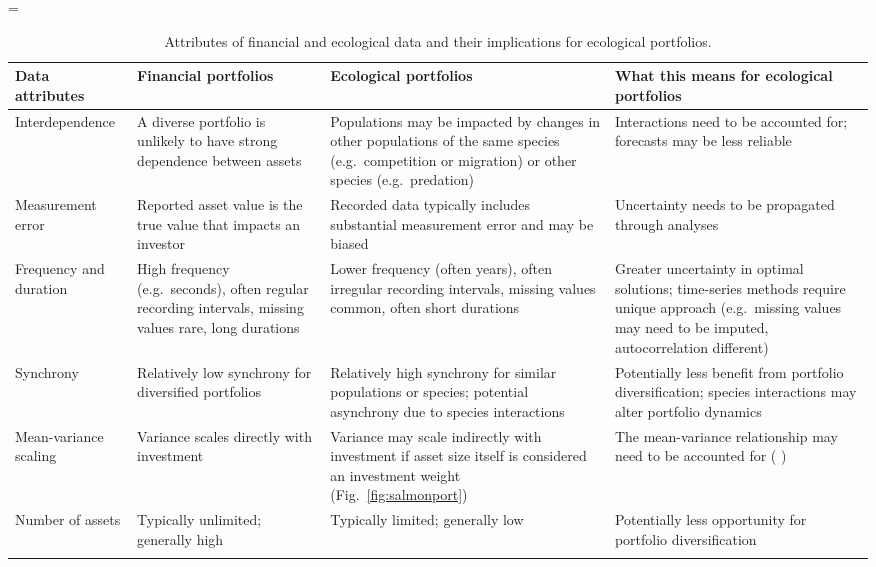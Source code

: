 \LTcapwidth=\textwidth
{}
\begin{footnotesize}

\begin{longtable}{>{\RaggedRight}p{2.7cm}>{\RaggedRight}p{3.3cm}>{\RaggedRight}p{3.9cm}>{\RaggedRight}p{4.2cm}}

\caption{Attributes of financial and ecological data and their implications for ecological portfolios.}\\
\toprule

\textbf{Data attributes} &
\textbf{Financial portfolios} &
\textbf{Ecological portfolios} &
\textbf{What this means for ecological portfolios}\\

\midrule

Interdependence &
A diverse portfolio is unlikely to have strong dependence between assets &
Populations may be impacted by changes in other populations of the same species (e.g.\ competition or migration) or other species (e.g.\ predation) &
Interactions need to be accounted for; forecasts may be less reliable\\

Measurement error &
Reported asset value is the true value that impacts an investor &
Recorded data typically includes substantial measurement error and may be biased &
Uncertainty needs to be propagated through analyses\\

Frequency and duration &
High frequency (e.g.\ seconds), often regular recording intervals, missing values rare, long durations &
Lower frequency (often years), often irregular recording intervals, missing values common, often short durations &
Greater uncertainty in optimal solutions; time-series methods require unique approach (e.g.\ missing values may need to be imputed, autocorrelation different)\\

Synchrony &
Relatively low synchrony for diversified portfolios &
Relatively high synchrony for similar populations or species; potential asynchrony due to species interactions &
Potentially less benefit from portfolio diversification; species interactions may alter portfolio dynamics\\

Mean-variance scaling &
Variance scales directly with investment &
Variance may scale indirectly with investment if asset size itself is considered an investment weight (Fig.~\ref{fig:salmonport}) &
The mean-variance relationship may need to be accounted for (\citeauthor{anderson2013} \citeyear{anderson2013})\\

Number of assets &
Typically unlimited; generally high &
Typically limited; generally low &
Potentially less opportunity for portfolio diversification\\

\bottomrule
\label{tab:data}
\end{longtable}
\end{footnotesize}
